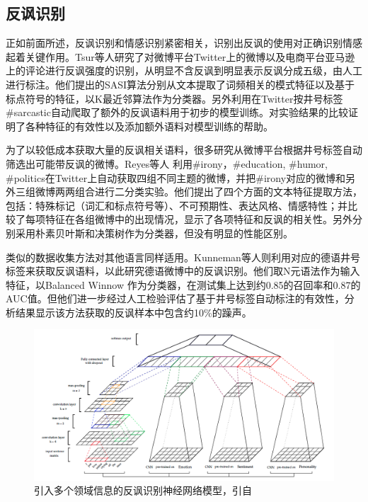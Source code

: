 \subsection{反讽识别}

正如前面所述，反讽识别和情感识别紧密相关，识别出反讽的使用对正确识别情感起着关键作用。Tsur等人\cite{tsur2010icwsm}\cite{davidov2010semi}研究了对微博平台Twitter上的微博以及电商平台亚马逊上的评论进行反讽强度的识别，从明显不含反讽到明显表示反讽分成五级，由人工进行标注。他们提出的SASI算法分别从文本提取了词频相关的模式特征以及基于标点符号的特征，以K最近邻算法作为分类器。另外利用在Twitter按井号标签\#sarcastic自动爬取了额外的反讽语料用于初步的模型训练。对实验结果的比较证明了各种特征的有效性以及添加额外语料对模型训练的帮助。

为了以较低成本获取大量的反讽相关语料，很多研究从微博平台根据井号标签自动筛选出可能带反讽的微博。Reyes等人 \cite{reyes2013multidimensional} 利用\#irony，\#education, \#humor, \#politics在Twitter上自动获取四组不同主题的微博，并把\#irony对应的微博和另外三组微博两两组合进行二分类实验。他们提出了四个方面的文本特征提取方法，包括：特殊标记（词汇和标点符号等）、不可预期性、表达风格、情感特性；并比较了每项特征在各组微博中的出现情况，显示了各项特征和反讽的相关性。另外分别采用朴素贝叶斯和决策树作为分类器，但没有明显的性能区别。

类似的数据收集方法对其他语言同样适用。Kunneman等人\cite{kunneman2015signaling}则利用对应的德语井号标签来获取反讽语料，以此研究德语微博中的反讽识别。他们取N元语法作为输入特征，以Balanced Winnow \cite{littlestone1988learning}作为分类器，在测试集上达到约0.85的召回率和0.87的AUC值。但他们进一步经过人工检验评估了基于井号标签自动标注的有效性，分析结果显示该方法获取的反讽样本中包含约10\%的躁声。

\begin{figure}[H] %
  \centering
  \includegraphics[width=\textwidth]{img/poria2016deeper.png}
  \caption{引入多个领域信息的反讽识别神经网络模型，引自\cite{poria2016deeper}}
  \label{fig:poria2016deeper}
\end{figure}

